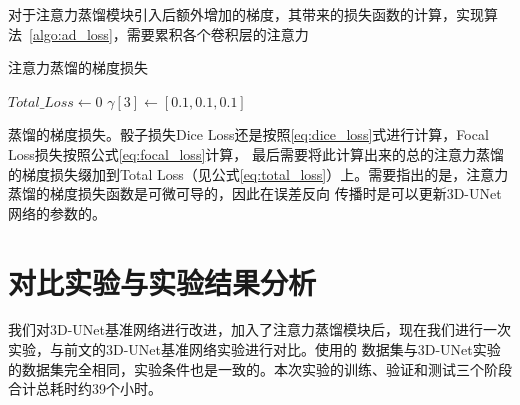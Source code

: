 对于注意力蒸馏模块引入后额外增加的梯度，其带来的损失函数的计算，实现算法~\ref{algo:ad_loss}，需要累积各个卷积层的注意力
\begin{algorithm}[htb]
    
    \caption{注意力蒸馏的梯度损失}
    \label{algo:ad_loss}
    \small
    \SetAlgoLined
    
    $Total\_Loss \leftarrow 0$
    \BlankLine
    $\gamma[3] \leftarrow [0.1, 0.1, 0.1]$
    \BlankLine
    
\end{algorithm}
蒸馏的梯度损失。骰子损失Dice Loss还是按照\ref{eq:dice_loss}式进行计算，Focal Loss损失按照公式\ref{eq:focal_loss}计算，
最后需要将此计算出来的总的注意力蒸馏的梯度损失缀加到Total Loss（见公式\ref{eq:total_loss}）上。需要指出的是，注意力蒸馏的梯度损失函数是可微可导的，因此在误差反向
传播时是可以更新3D-UNet网络的参数的。

\section{对比实验与实验结果分析}
我们对3D-UNet基准网络进行改进，加入了注意力蒸馏模块后，现在我们进行一次实验，与前文的3D-UNet基准网络实验进行对比。使用的
数据集与3D-UNet实验的数据集完全相同，实验条件也是一致的。本次实验的训练、验证和测试三个阶段合计总耗时约39个小时。

